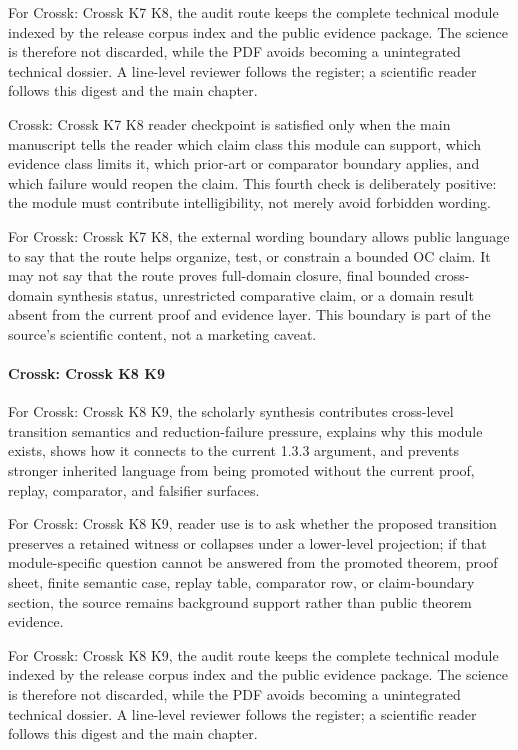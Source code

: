 For Crossk: Crossk K7 K8, the audit route keeps the complete technical module indexed by the release corpus index and the public evidence package. The science is therefore not discarded, while the PDF avoids becoming a unintegrated technical dossier. A line-level reviewer follows the register; a scientific reader follows this digest and the main chapter.


Crossk: Crossk K7 K8 reader checkpoint is satisfied only when the main manuscript tells the reader which claim class this module can support, which evidence class limits it, which prior-art or comparator boundary applies, and which failure would reopen the claim. This fourth check is deliberately positive: the module must contribute intelligibility, not merely avoid forbidden wording.


For Crossk: Crossk K7 K8, the external wording boundary allows public language to say that the route helps organize, test, or constrain a bounded OC claim. It may not say that the route proves full-domain closure, final bounded cross-domain synthesis status, unrestricted comparative claim, or a domain result absent from the current proof and evidence layer. This boundary is part of the source's scientific content, not a marketing caveat.


\paragraph{Crossk: Crossk K8 K9}

For Crossk: Crossk K8 K9, the scholarly synthesis contributes cross-level transition semantics and reduction-failure pressure, explains why this module exists, shows how it connects to the current 1.3.3 argument, and prevents stronger inherited language from being promoted without the current proof, replay, comparator, and falsifier surfaces.


For Crossk: Crossk K8 K9, reader use is to ask whether the proposed transition preserves a retained witness or collapses under a lower-level projection; if that module-specific question cannot be answered from the promoted theorem, proof sheet, finite semantic case, replay table, comparator row, or claim-boundary section, the source remains background support rather than public theorem evidence.


For Crossk: Crossk K8 K9, the audit route keeps the complete technical module indexed by the release corpus index and the public evidence package. The science is therefore not discarded, while the PDF avoids becoming a unintegrated technical dossier. A line-level reviewer follows the register; a scientific reader follows this digest and the main chapter.


